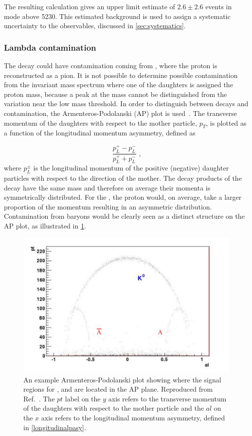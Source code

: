 The resulting calculation gives an upper limit estimate of $2.6 \pm 2.6$  events in \pik mode above 5230\mev. This estimated \Bs background is used to assign a systematic uncertainty to the \CP observables, discussed in \sect\ref{sec:systematics}.


\subsubsection{Lambda contamination}
\label{sec:backgrounds:contamination}

The \decay{\KS}{\pip\pim} decay could have contamination coming from \decay{\Lz}{\proton\pim}, where the proton is reconstructed as a pion. It is not possible to determine possible \Lz contamination from the \KS invariant mass spectrum where one of the \KS daughters is assigned the proton mass, because a peak at the \Lz mass cannot be distinguished from the variation near the low mass threshold. In order to distinguish between \KS decays and \Lz contamination, the Armenteros-Podolanski (AP) plot is used~\cite{APplot}. The transverse momentum of the daughters with respect to the mother particle, $p_T$, is plotted as a function of the longitudinal momentum asymmetry, defined as

\begin{equation}
\frac{p_L^+ - p_L^-}{p_L^+ + p_L^-} \text{ ,}
\label{longitudinalpasy}
\end{equation}
where $p_L^{\pm}$ is the longitudinal momentum of the positive (negative) daughter particles with respect to the direction of the mother. The decay products of the \decay{\KS}{\pip\pim} decay have the same mass and therefore on average their momenta is symmetrically distributed. For the \decay{\Lz}{\proton\pim}, the proton would, on average, take a larger proportion of the momentum resulting in an asymmetric distribution. Contamination from \Lz baryons would be clearly seen as a distinct structure on the AP plot, as illustrated in \fig\ref{apexample}. 

\begin{figure}
\centering
\includegraphics[width=0.5\linewidth]{figures/backgrounds/APfromPaper.pdf}
\caption{An example Armenteros-Podolanski plot showing where the signal regions for \KS, \Lz and \Lbar are located in the AP plane. Reproduced from Ref.~\cite{APplot}. The $pt$ label on the $y$ axis refers to the transverse momentum of the daughters with respect to the mother particle and the $al$ on the $x$ axis refers to the longitudinal momentum asymmetry, defined in \eqn\ref{longitudinalpasy}.}
\label{apexample}
\end{figure}

